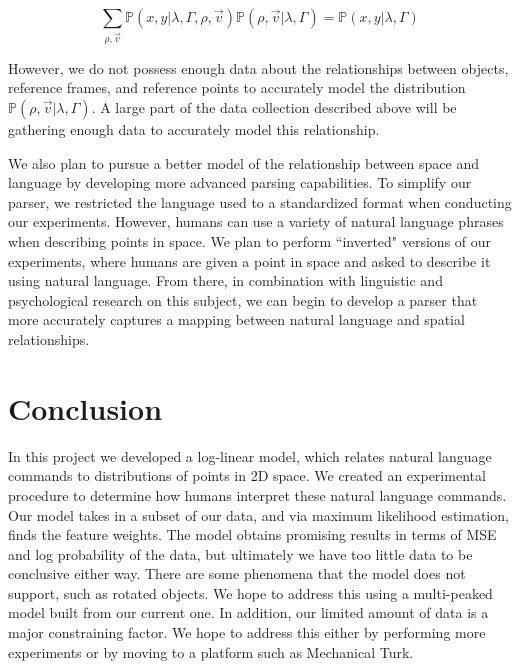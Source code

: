 \documentclass[12pt,letterpaper]{article}
\newcommand\prob{\mathbb{P}}
\begin{document}
\[
\sum_{\rho, \vec{v}} \prob(x, y | \lambda,\Gamma, \rho, \vec{v} )\prob(\rho, \vec{v} | \lambda, \Gamma) = \prob(x, y | \lambda, \Gamma)
\]

However, we do not possess enough data about the relationships between objects, reference frames, and reference points to accurately model the distribution $\prob(\rho, \vec{v} | \lambda, \Gamma)$. A large part of the data collection described above will be gathering enough data to accurately model this relationship. 

We also plan to pursue a better model of the relationship between space and language by developing more advanced parsing capabilities. To simplify our parser, we restricted the language used to a standardized format when conducting our experiments. However, humans can use a variety of natural language phrases when describing points in space. We plan to perform ``inverted" versions of our experiments, where humans are given a point in space and asked to describe it using natural language. From there, in combination with linguistic and psychological research on this subject, we can begin to develop a parser that more accurately captures a mapping between natural language and spatial relationships. 

\section{Conclusion}
In this project we developed a log-linear model, which relates natural language commands to distributions of points in 2D space. We created an experimental procedure to determine how humans interpret these natural language commands. Our model takes in a subset of our data, and via maximum likelihood estimation, finds the feature weights. The model obtains promising results in terms of MSE and log probability of the data, but ultimately we have too little data to be conclusive either way. There are some phenomena that the model does not support, such as rotated objects. We hope to address this using a multi-peaked model built from our current one. In addition, our limited amount of data is a major constraining factor. We hope to address this either by performing more experiments or by moving to a platform such as Mechanical Turk.
\end{document}

